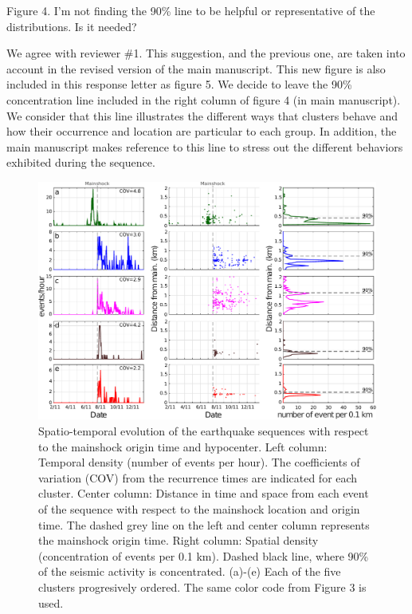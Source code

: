 \documentclass[10pt]{extarticle}
\begin{document}
\begin{ReviewerComment}{1}
\noindent 
Figure 4. I'm not finding the 90\% line to be helpful or representative of the distributions. Is it needed?
\end{ReviewerComment}


\begin{Answer}
 \WorkInProgressRevTask
We agree with reviewer \#1. This suggestion, and the previous one, are taken into account in the revised version of the main manuscript. This new figure is also included in this response letter as figure 5. We decide to leave the 90\% concentration line included in the right column of figure 4 (in main manuscript). We consider that this line illustrates the different ways that clusters behave and how their occurrence and location are particular to each group. In addition, the main manuscript makes reference to this line to stress out the different behaviors exhibited during the sequence.
\begin{figure}[!h]
\begin{center}
     \includegraphics[width=1\linewidth]{densities_plot}         \caption{Spatio-temporal evolution of the earthquake sequences with respect to the mainshock origin time and hypocenter. Left column: Temporal density (number of events per hour). The coefficients of variation (COV) from the recurrence times are indicated for each cluster. Center column: Distance in time and space from each event of the sequence with respect to the mainshock location and origin time. The dashed grey line on the left and center column represents the mainshock origin time. Right column: Spatial density (concentration of events per 0.1 km). Dashed black line, where 90\% of the seismic activity is concentrated. (a)-(e) Each of the five clusters progresively ordered. The same color code from Figure 3 is used.}
\end{center}
\label{fig:new_fig_4}
\end{figure}
\end{Answer}
%
%
\end{document}
